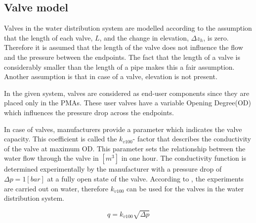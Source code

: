 \subsection{Valve model}  
\label{ValveModel}


Valves in the water distribution system are modelled according to the assumption that the length of each valve, $L$, and the change in elevation, $\Delta z_h$, is zero. Therefore it is assumed that the length of the valve does not influence the flow and the pressure between the endpoints. The fact that the length of a valve is considerably smaller than the length of a pipe makes this a fair assumption. Another assumption is that in case of a valve, elevation is not present. 

In the given system, valves are considered as end-user components since they are placed only in the PMAs. These user valves have a variable Opening Degree(OD) which influences the pressure drop across the endpoints. 

%


In case of valves, manufacturers provide a parameter which indicates the valve capacity. This coefficient is called the $k_{v100}$- factor that describes the conductivity of the valve at maximum OD. This parameter sets the relationship between the water flow through the valve in $[m^{3}]$ in one hour. The conductivity function is determined experimentally by the manufacturer with a pressure drop of $\Delta p = 1 [bar]$ at a fully open state of the valve. According to \cite{kvvalve}, the experiments are carried out on water, therefore $k_{v100}$ can be used for the valves in the water distribution system. 

\begin{equation}
\label{kvequation}
 q =  k_{v100} \sqrt{\Delta p} 
\end{equation}

